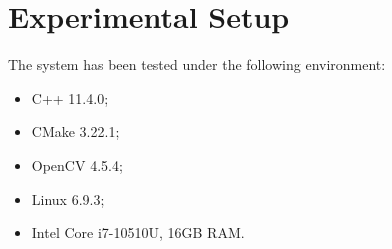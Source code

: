 \section{Experimental Setup}


The system has been tested under the following environment:
\begin{itemize}
    \item C++ 11.4.0;
    \item CMake 3.22.1;
    \item OpenCV 4.5.4;
    \item Linux 6.9.3;
    \item Intel Core i7-10510U, 16GB RAM.
\end{itemize}